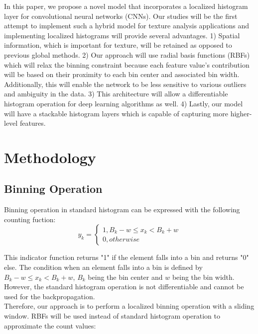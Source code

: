 \documentclass[10pt,twocolumn,letterpaper]{article}
\begin{document}
In this paper, we propose a novel model that incorporates a localized histogram layer for convolutional neural  networks (CNNs). Our studies will be the first attempt to implement such a hybrid model for texture analysis applications and implementing localized histograms will provide several advantages.
1) Spatial information, which is important for texture, will be retained as opposed to previous global methods. 2) Our approach will use radial basis functions (RBFs) which will relax the binning constraint because each feature value's contribution will be based on their proximity to each bin center and associated bin width. Additionally, this will enable the network to be less sensitive to various outliers and ambiguity in the data. 3) This architecture will allow a differentiable histogram operation for deep learning algorithms as well. 4) Lastly, our model will have a stackable histogram layers which is capable of capturing more higher-level features.
\\




\section{Methodology}

\subsection{Binning Operation}

Binning operation in standard histogram can be expressed with the following counting fuction:
\begin{equation}
\label{eqn:cf}
y_k = \begin{cases}
1,B_k - w \leq x_k < B_k + w\\
0, otherwise
\end{cases}
\end{equation}

This indicator function returns "1" if the  element falls into a bin and returns "0" else. The condition when an element falls into a bin is defined by $B_k - w \leq x_k < B_k + w$, $B_k$ being the bin center and $w$ being the bin width. However, the standard histogram operation is not differentiable and cannot be used for the backpropagation.\\

Therefore, our approach is to perform a localized binning operation with a sliding window. RBFs will be used instead of standard histogram operation to approximate the count values:
\end{document}
